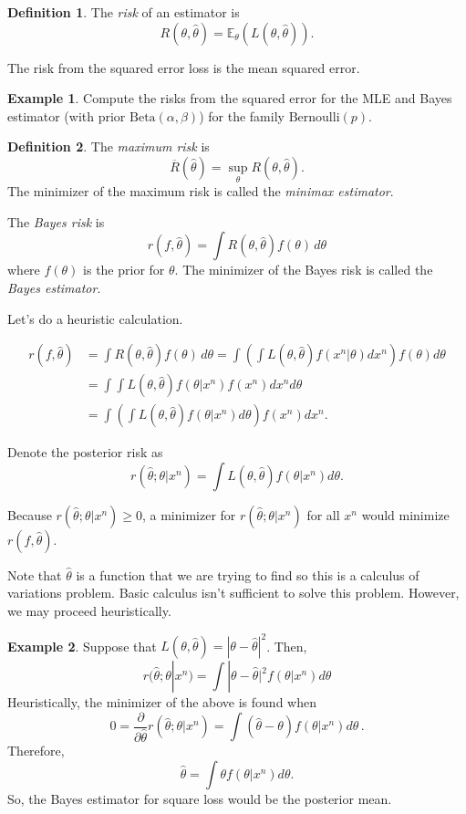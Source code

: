 \documentclass[
  openany]{book}
\theoremstyle{definition}
\newtheorem{definition}{Definition}[chapter]
\theoremstyle{definition}
\newtheorem{example}{Example}[chapter]
\theoremstyle{definition}
\theoremstyle{definition}
\theoremstyle{remark}
\begin{document}
\begin{definition}
The \emph{risk} of an estimator is
\[ R(\theta, \hat\theta) = \mathbb{E}_\theta (L(\theta,\hat \theta)). \]
\end{definition}

The risk from the squared error loss is the mean squared error.

\begin{example}
Compute the risks from the squared error for the MLE and Bayes estimator (with prior \(\mathrm{Beta}(\alpha, \beta)\)) for the
family \(\mathrm{Bernoulli}(p)\).
\end{example}

\begin{definition}
The \emph{maximum risk} is
\[ \overline{R}(\hat \theta) = \sup_\theta R(\theta, \hat \theta).\]
The minimizer of the maximum risk is called the \emph{minimax estimator}.

The \emph{Bayes risk} is
\[ r(f, \hat \theta) = \int R(\theta, \hat\theta) f(\theta) \, d\theta\]
where \(f(\theta)\) is the prior for \(\theta\).
The minimizer of the Bayes risk is called the \emph{Bayes estimator}.
\end{definition}

Let's do a heuristic calculation.

\begin{align*}
r(f,\hat \theta) &= \int R(\theta, \hat \theta) f(\theta) \, d\theta 
        = \int \left( \int L(\theta, \hat \theta) f(x^n| \theta) dx^n \right) f(\theta) d \theta \\
        &= \int  \int L(\theta, \hat \theta)   f(\theta|x^n) f(x^n) d x^n d \theta \\
        &= \int  \left( \int L(\theta, \hat \theta)   f(\theta|x^n) d \theta \right) f(x^n) d x^n .
\end{align*}

Denote the posterior risk as
\[r(\hat \theta; \theta |x^n) = \int L(\theta, \hat \theta)   f(\theta|x^n) d \theta.  \]

Because \(r(\hat \theta; \theta | x^n) \geq 0\), a minimizer for
\(r(\hat \theta; \theta | x^n)\) for all \(x^n\)
would minimize \(r(f, \hat \theta)\).

Note that \(\hat \theta\) is a function that we are trying to find so
this is a calculus of variations problem. Basic calculus isn't sufficient
to solve this problem. However, we may proceed heuristically.

\begin{example}
Suppose that \(L(\theta, \hat \theta) = |\theta - \hat \theta|^2\).
Then,
\[r(\hat \theta; \theta | x^n) = \int |\theta - \hat \theta|^2 f(\theta| x^n)  d\theta\]
Heuristically, the minimizer of the above is found when
\[ 0 =   \frac{\partial}{\partial \hat\theta} r(\hat \theta; \theta | x^n) 
=  \int (\hat \theta - \theta  ) f(\theta| x^n)  d\theta \,.\]
Therefore,
\[ \hat \theta = \int \theta f(\theta | x^n) d \theta.\]
So, the Bayes estimator for square loss would be the posterior mean.
\end{example}
\end{document}
